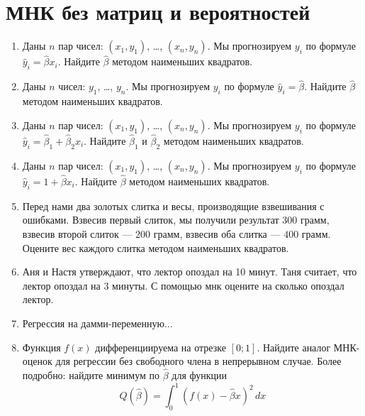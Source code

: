 \documentclass[pdftex,12pt,a4paper]{article}
\def \hb{\hat{\beta}}
\def \hy{\hat{y}}
\newcommand{\solution}[1]{}
\newcommand{\problem}[1]{#1}
\begin{document}
\section{МНК без матриц и вероятностей}

\begin{enumerate}
\item \problem{Даны $n$ пар чисел: $(x_1, y_1)$, \ldots, $(x_n,y_n)$. Мы прогнозируем $y_i$ по формуле $\hy_i=\hb x_i$. Найдите $\hb$ методом наименьших квадратов. }
\solution{$\hb=\sum x_i y_i/\sum x_i^2$}

\item \problem{Даны $n$ чисел: $y_1$, \ldots, $y_n$. Мы прогнозируем $y_i$ по формуле $\hy_i=\hb$. Найдите $\hb$ методом наименьших квадратов. }
\solution{$\hb=\bar{y}$}

\item \problem{Даны $n$ пар чисел: $(x_1, y_1)$, \ldots, $(x_n,y_n)$. Мы прогнозируем $y_i$ по формуле $\hy_i=\hb_1+\hb_2 x_i$. Найдите $\hb_1$ и $\hb_2$ методом наименьших квадратов. }
\solution{$\hb_2=\sum (x_i-\bar{x})(y_i-\bar{y})/\sum(x_i-\bar{x})^2$, $\hb_1=\bar{y}-\hb_2\bar{x}$}

\item \problem{Даны $n$ пар чисел: $(x_1, y_1)$, \ldots, $(x_n,y_n)$. Мы прогнозируем $y_i$ по формуле $\hy_i=1+\hb x_i$. Найдите $\hb$ методом наименьших квадратов. }
\solution{$\hb=\sum x_i (y_i-1)/\sum x_i^2$}

\item \problem{ Перед нами два золотых слитка и весы, производящие взвешивания с ошибками. Взвесив первый слиток, мы получили результат $300$ грамм, взвесив второй слиток --- $200$ грамм, взвесив оба слитка --- $400$ грамм. Оцените вес каждого слитка методом наименьших квадратов.}
\solution{ $(300-\hb_1)^2+(200-\hb_2)^2+(400-\hb_1-\hb_2)^2\to\min$ }


\item Аня и Настя утверждают, что лектор опоздал на 10 минут. Таня считает, что лектор опоздал на 3 минуты. С помощью мнк оцените на сколько опоздал лектор. 
\solution{ $2\cdot (10-\hb)^2+(3-\hb)^2\to\min$ }

\item Регрессия на дамми-переменную...



\item Функция $f(x)$ дифференциируема на отрезке $[0;1]$. Найдите аналог МНК-оценок для регрессии без свободного члена в непрерывном случае. Более подробно: найдите минимум по $\hb$ для функции
\begin{equation}
Q(\hb)= \int_0^1 (f(x)-\hb x)^2\,dx
\end{equation}
\solution{}


\end{enumerate}
\end{document}

